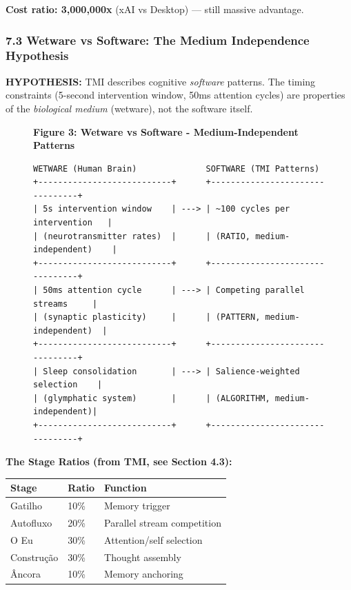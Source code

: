 \documentclass[
  11pt,
]{article}
\newcounter{none} %
\begin{document}
\textbf{Cost ratio: 3,000,000x} (xAI vs Desktop) --- still massive
advantage.

\subsubsection{7.3 Wetware vs Software: The Medium Independence
Hypothesis}\label{wetware-vs-software-the-medium-independence-hypothesis}

\textbf{HYPOTHESIS:} TMI describes cognitive \emph{software} patterns.
The timing constraints (5-second intervention window, 50ms attention
cycles) are properties of the \emph{biological medium} (wetware), not
the software itself.

\begin{figure}[H]
\centering
\textbf{Figure 3: Wetware vs Software - Medium-Independent Patterns}
\begin{verbatim}
WETWARE (Human Brain)              SOFTWARE (TMI Patterns)
+---------------------------+      +--------------------------------+
| 5s intervention window    | ---> | ~100 cycles per intervention   |
| (neurotransmitter rates)  |      | (RATIO, medium-independent)    |
+---------------------------+      +--------------------------------+
| 50ms attention cycle      | ---> | Competing parallel streams     |
| (synaptic plasticity)     |      | (PATTERN, medium-independent)  |
+---------------------------+      +--------------------------------+
| Sleep consolidation       | ---> | Salience-weighted selection    |
| (glymphatic system)       |      | (ALGORITHM, medium-independent)|
+---------------------------+      +--------------------------------+
\end{verbatim}
\end{figure}

\textbf{The Stage Ratios (from TMI, see Section 4.3):}

{\def\LTcaptype{none} %
\begin{longtable}[]{@{}lll@{}}
\toprule\noalign{}
Stage & Ratio & Function \\
\midrule\noalign{}
\endhead
\bottomrule\noalign{}
\endlastfoot
Gatilho & 10\% & Memory trigger \\
Autofluxo & 20\% & Parallel stream competition \\
O Eu & 30\% & Attention/self selection \\
Construção & 30\% & Thought assembly \\
Âncora & 10\% & Memory anchoring \\
\end{longtable}
}
\end{document}
